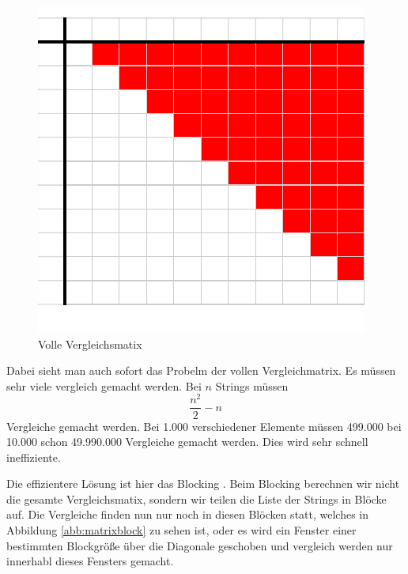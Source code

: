\documentclass[sigconf]{acmart}
\begin{document}
\begin{figure}[htbp]
  \centering
  \includegraphics{table.pdf}
  \caption{Volle Vergleichsmatix}
  \label{abb:matrix}
\end{figure}

Dabei sieht man auch sofort das Probelm der vollen Vergleichmatrix.
Es müssen sehr viele vergleich gemacht werden. Bei $n$
Strings müssen 
$$\frac{n^2}{2} - n$$ 
Vergleiche gemacht werden. 
Bei 1.000 verschiedener
Elemente müssen 499.000 bei 10.000 schon 49.990.000 Vergleiche 
gemacht werden. Dies wird sehr schnell ineffiziente.

Die effizientere Lösung ist hier das Blocking \cite[Vlg. S. 11]{elmagarmid1}.
Beim Blocking berechnen wir nicht die gesamte 
Vergleichsmatix, sondern wir teilen die Liste der Strings 
in Blöcke auf. Die Vergleiche finden nun nur noch in diesen
Blöcken statt, welches in Abbildung \ref{abb:matrixblock} zu sehen ist,
oder es wird ein Fenster einer bestimmten Blockgröße über die
Diagonale geschoben und vergleich werden nur innerhabl
dieses Fensters gemacht.
\end{document}
